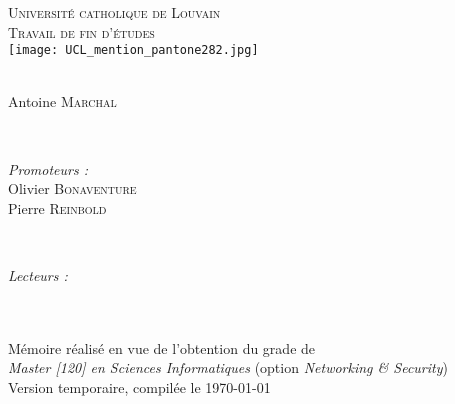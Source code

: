 \documentclass[a4paper, twoside, 12pt,french]{report}
\begin{document}
\begin{titlepage}
\center

\textsc{\LARGE Université catholique de Louvain}\\[1cm]
\textsc{\Large Travail de fin d'études}\\[2cm]

\texttt{[image: UCL\_mention\_pantone282.jpg]}\\[1.5cm]

\textsc{\Large }\\[1.5cm]

\begin{minipage}{0.4\textwidth}
\begin{center}
\large Antoine \textsc{Marchal}
\end{center}
\end{minipage}\\[3cm]

\begin{minipage}{0.4\textwidth}
\begin{flushleft} \large
\emph{Promoteurs :} \\
Olivier \textsc{Bonaventure}\\
Pierre \textsc{Reinbold}
\end{flushleft}
\end{minipage}
~
\begin{minipage}{0.4\textwidth}
\begin{flushright} \large
\emph{Lecteurs :} \\
 \textsc{}\\
 \textsc{}
\end{flushright}
\end{minipage}\\[1.5cm]


{\normalsize Mémoire réalisé en vue de l'obtention du grade de\\
\emph{Master [120] en Sciences Informatiques} (option \emph{Networking \& Security})}\\[1.5cm]

{\huge Version temporaire, compilée le \today}

\end{titlepage}

\pagestyle{empty} %
\tableofcontents
\restoregeometry
\clearpage %
\pagestyle{fancy}














\end{document}
